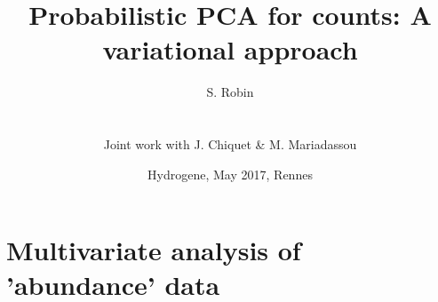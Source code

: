 \documentclass[12pt]{beamer}
\newcommand{\fignet}{/home/robin/Bureau/RECHERCHE/RESEAUX/EXPOSES/FIGURES}
\begin{document}

\title[Probabilistic PCA for counts]{Probabilistic PCA for counts: A variational approach}

\author[S. Robin]{S. Robin \\ ~\\
  \begin{tabular}{ll}
    Joint work with J. Chiquet \& M. Mariadassou
  \end{tabular}
  }


\date[May 2017, Rennes]{Hydrogene, May 2017, Rennes}

\maketitle

\section{Multivariate analysis of 'abundance' data}

\end{document}
